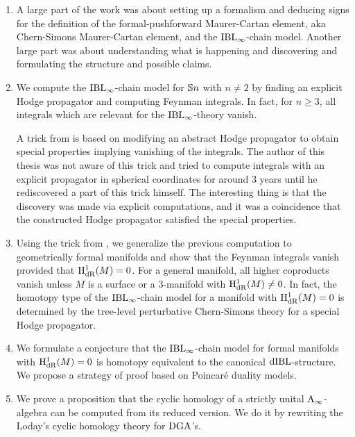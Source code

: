 \documentclass[\MainFolder/Text.tex]{subfiles}
\begin{document}
\begin{enumerate}[label=\arabic*)]

\item A large part of the work was about setting up a formalism and deducing signs for the definition of the formal-pushforward Maurer-Cartan element, aka Chern-Simons Maurer-Cartan element, and the $\mathrm{IBL}_\infty$-chain model. Another large part was about understanding what is happening and discovering and formulating the structure and possible claims.

\item We compute the $\mathrm{IBL}_\infty$-chain model for $\mathbb{S}{n}$ with $n\neq 2$ by finding an explicit Hodge propagator and computing Feynman integrals. In fact, for $n\ge 3$, all integrals which are relevant for the $\mathrm{IBL}_\infty$-theory vanish.
 
A trick from \cite{Mnev2009} is based on modifying an abstract Hodge propagator to obtain special properties implying vanishing of the integrals. The author of this thesis was not aware of this trick and tried to compute integrals with an explicit propagator in spherical coordinates for around 3 years until he rediscovered a part of this trick himself. The interesting thing is that the discovery was made via explicit computations, and it was a coincidence that the constructed Hodge propagator satisfied the special properties.
 
\item Using the trick from \cite{Mnev2009}, we generalize the previous computation to geometrically formal manifolds and show that the Feynman integrals vanish provided that $\mathrm{H}_{\mathrm{dR}}^1(M) = 0$. For a general manifold, all higher coproducts vanish unless $M$ is a surface or a $3$-manifold with $\mathrm{H}_{\mathrm{dR}}^1(M) \neq 0$. In fact, the homotopy type of the $\mathrm{IBL}_\infty$-chain model for a manifold with $\mathrm{H}_{\mathrm{dR}}^1(M) = 0$ is determined by the tree-level perturbative Chern-Simons theory for a special Hodge propagator.

\item We formulate a conjecture that the $\mathrm{IBL}_\infty$-chain model for formal manifolds with $\mathrm{H}_{\mathrm{dR}}^1(M) = 0$ is homotopy equivalent to the canonical $\mathrm{dIBL}$-structure. We propose a strategy of proof based on Poincar\'e duality models.
 
\item We prove a proposition that the cyclic homology of a strictly unital $\mathrm{A}_\infty$-algebra can be computed from its reduced version. We do it by rewriting the Loday's cyclic homology theory for $\mathrm{DGA}$'s.


\end{enumerate}
\end{document}
